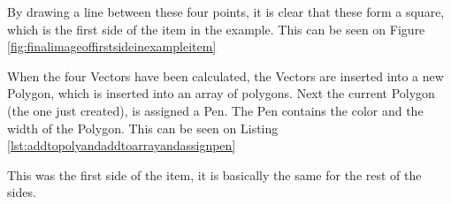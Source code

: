 By drawing a line between these four points, it is clear that these form a square, which is the first side of the item in the example. This can be seen on Figure \ref{fig:finalimageoffirstsideinexampleitem}

When the four Vectors have been calculated, the Vectors are inserted into a new Polygon, which is inserted into an array of polygons.  Next the current Polygon (the one just created), is assigned a Pen. The Pen contains the color and the width of the Polygon. This can be seen on Listing \ref{lst:addtopolyandaddtoarrayandassignpen}


This was the first side of the item, it is basically the same for the rest of the sides. 

